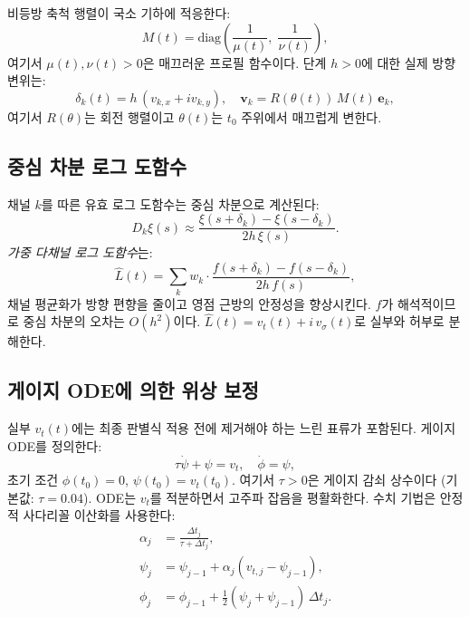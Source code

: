 \documentclass[11pt, a4paper]{article}
\theoremstyle{definition}
\theoremstyle{plain}
\newcommand{\xif}{\xi}
\newcommand{\Lhat}{\hat{L}}
\begin{document}
비등방 축척 행렬이 국소 기하에 적응한다:
\begin{equation}
  M(t) = \mathrm{diag}\!\left(\frac{1}{\mu(t)},\;
  \frac{1}{\nu(t)}\right),
  \label{eq:aniso_scale}
\end{equation}
여기서 $\mu(t), \nu(t) > 0$은 매끄러운 프로필 함수이다. 단계 $h > 0$에 대한 실제 방향 변위는:
\begin{equation}
  \delta_k(t) = h\,(v_{k,x} + iv_{k,y}), \quad
  \mathbf{v}_k = R(\theta(t))\,M(t)\,\mathbf{e}_k,
  \label{eq:displacement}
\end{equation}
여기서 $R(\theta)$는 회전 행렬이고 $\theta(t)$는 $t_0$ 주위에서 매끄럽게 변한다.


\subsection{중심 차분 로그 도함수}
\label{sec:central_diff}

채널 $k$를 따른 유효 로그 도함수는 중심 차분으로 계산된다:
\begin{equation}
  D_k\xif(s) \approx
  \frac{\xif(s + \delta_k) - \xif(s - \delta_k)}{2h\,\xif(s)}.
  \label{eq:central_diff}
\end{equation}
\textit{가중 다채널 로그 도함수}는:
\begin{equation}
  \Lhat(t) = \sum_k w_k \cdot
  \frac{f(s + \delta_k) - f(s - \delta_k)}{2h\,f(s)},
  \label{eq:lhat}
\end{equation}
채널 평균화가 방향 편향을 줄이고 영점 근방의 안정성을 향상시킨다. $f$가 해석적이므로 중심 차분의 오차는 $O(h^2)$이다. $\Lhat(t) = v_t(t) + i\,v_\sigma(t)$로 실부와 허부로 분해한다.


\subsection{게이지 ODE에 의한 위상 보정}
\label{sec:gauge_ode}

실부 $v_t(t)$에는 최종 판별식 적용 전에 제거해야 하는 느린 표류가 포함된다. 게이지 ODE를 정의한다:
\begin{equation}
  \tau\dot{\psi} + \psi = v_t, \quad \dot{\phi} = \psi,
  \label{eq:gauge_ode}
\end{equation}
초기 조건 $\phi(t_0) = 0$, $\psi(t_0) = v_t(t_0)$. 여기서 $\tau > 0$은 게이지 감쇠 상수이다 (기본값: $\tau = 0.04$). ODE는 $v_t$를 적분하면서 고주파 잡음을 평활화한다. 수치 기법은 안정적 사다리꼴 이산화를 사용한다:
\begin{align}
  \alpha_j &= \frac{\Delta t_j}{\tau + \Delta t_j},
  \label{eq:ode_alpha}\\
  \psi_j &= \psi_{j-1} + \alpha_j(v_{t,j} - \psi_{j-1}),
  \label{eq:ode_psi}\\
  \phi_j &= \phi_{j-1} + \tfrac{1}{2}(\psi_j + \psi_{j-1})\,\Delta t_j.
  \label{eq:ode_phi}
\end{align}
\end{document}
